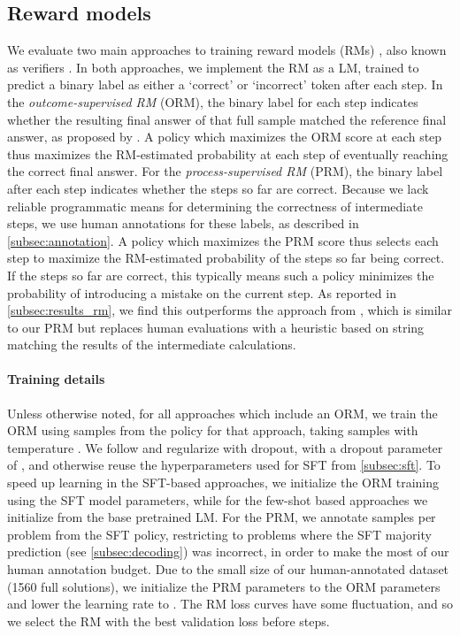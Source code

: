 \documentclass[11pt, a4paper, logo]{deepmind}
\newcommand{\ORM}{ORM}
\newcommand{\PRM}{PRM}
\begin{document}
\subsection{Reward models}
\label{subsec:rm}

We evaluate two main approaches to training reward models (RMs) \citep{christiano2017deep, ziegler2019fine, menick2022teaching}, also known as verifiers \citep{cobbe2021training}.
In both approaches, we implement the RM as a LM, trained to predict a binary label as either a `correct' or `incorrect' token after each step. In the \emph{outcome-supervised RM} (\ORM), the binary label for each step indicates whether the resulting final answer of that full sample matched the reference final answer, as proposed by \citet{cobbe2021training}.
A policy which maximizes the \ORM{} score at each step thus maximizes the RM-estimated probability at each step of eventually reaching the correct final answer.
For the \emph{process-supervised RM} (\PRM{}), the binary label after each step indicates whether the steps so far are correct.
Because we lack reliable programmatic means for determining the correctness of intermediate steps, we use human annotations for these labels, as described in \cref{subsec:annotation}.
A policy which maximizes the PRM score thus selects each step to maximize the RM-estimated probability of the steps so far being correct. If the steps so far are correct, this typically means such a policy minimizes the probability of introducing a mistake on the current step. As reported in \cref{subsec:results_rm}, we find this outperforms the approach from \citet{li2022advance}, which is similar to our \PRM{} but replaces human evaluations with a heuristic based on string matching the results of the intermediate calculations. 

\paragraph{Training details}
Unless otherwise noted, for all approaches which include an \ORM{}, we train the \ORM{} using samples from the policy for that approach, taking  samples with temperature .
We follow \citet{cobbe2021training} and regularize with dropout, with a dropout parameter of , and otherwise reuse the hyperparameters used for SFT from \cref{subsec:sft}.
To speed up learning in the SFT-based approaches, we initialize the \ORM{} training using the SFT model parameters, while for the few-shot based approaches we initialize from the base pretrained LM.
For the \PRM, we annotate  samples per problem from the SFT policy, restricting to problems where the SFT majority prediction (see \cref{subsec:decoding}) was incorrect, in order to make the most of our human annotation budget.
Due to the small size of our human-annotated dataset (1560 full solutions), we initialize the \PRM{} parameters to the \ORM{} parameters and lower the learning rate to .
The RM loss curves have some fluctuation, and so we select the RM with the best validation loss before  steps.
\end{document}
